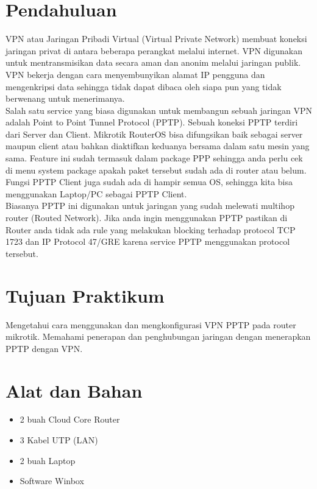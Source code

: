 \section{Pendahuluan}
\indent VPN atau Jaringan Pribadi Virtual (Virtual Private Network) membuat koneksi jaringan privat di antara
beberapa perangkat melalui internet. VPN digunakan untuk mentransmisikan data secara aman dan
anonim melalui jaringan publik. VPN bekerja dengan cara menyembunyikan alamat IP pengguna dan
mengenkripsi data sehingga tidak dapat dibaca oleh siapa pun yang tidak berwenang untuk menerimanya.
\\ \indent Salah satu service yang biasa digunakan untuk membangun sebuah jaringan VPN adalah Point to
Point Tunnel Protocol (PPTP). Sebuah koneksi PPTP terdiri dari Server dan Client. Mikrotik RouterOS
bisa difungsikan baik sebagai server maupun client atau bahkan diaktifkan keduanya bersama dalam
satu mesin yang sama. Feature ini sudah termasuk dalam package PPP sehingga anda perlu cek di
menu system package apakah paket tersebut sudah ada di router atau belum. Fungsi PPTP Client
juga sudah ada di hampir semua OS, sehingga kita bisa menggunakan Laptop/PC sebagai PPTP
Client.
\\ \indent Biasanya PPTP ini digunakan untuk jaringan yang sudah melewati multihop router (Routed Network).
Jika anda ingin menggunakan PPTP pastikan di Router anda tidak ada rule yang melakukan blocking
terhadap protocol TCP 1723 dan IP Protocol 47/GRE karena service PPTP menggunakan protocol
tersebut.



\section{Tujuan Praktikum}
Mengetahui cara menggunakan dan mengkonfigurasi VPN PPTP pada router mikrotik. Memahami penerapan dan penghubungan jaringan dengan menerapkan PPTP dengan VPN.

\section{Alat dan Bahan}
\begin{itemize}[label=$\bullet$, itemsep=-1pt, leftmargin=*]
	\item 2 buah Cloud Core Router
	\item 3 Kabel UTP (LAN)
	\item 2 buah Laptop
	\item Software Winbox
\end{itemize}

